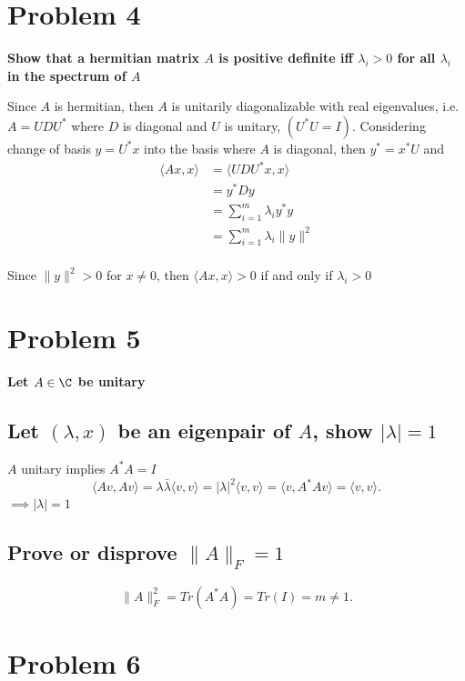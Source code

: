 \section{Problem 4}%
\label{sec:problem_4}

\textbf{Show that a hermitian matrix $A$ is positive definite iff $\lambda
_{i}>0$ for all $\lambda _{i}$ in the spectrum of $A$} 

Since $A$ is hermitian, then $A$ is unitarily diagonalizable with real
eigenvalues, i.e. $A = UDU^{*}$ where $D$ is diagonal and $U$ is unitary,
$ (U^{*}U = I)$. Considering change of basis $y = U^{*}x$ into the basis where
$A$ is diagonal, then $y^{*} = x^{*}U$ and
\begin{align*}
  \langle Ax,x \rangle &= \langle UDU^{*}x,x \rangle \\
                       &= y^{*}Dy \\
                       &= \sum^{m}_{i=1} \lambda _{i}y^{*}y \\
                       &= \sum^{m}_{i=1} \lambda _{i}\|y\|^{2} \\
\end{align*}

Since $\|y\|^{2} > 0$ for $x \neq 0$, then $ \langle Ax,x \rangle > 0 $ if and
only if $\lambda _{i} > 0$

\section{Problem 5}%
\label{sec:problem_5}

\textbf{Let $A\in\C$ be unitary} 

\subsection{Let $ (\lambda, x)$ be an eigenpair of $A$, show $|\lambda | = 1$}%
\label{sub:5.1}
$A$ unitary implies $A^{*}A = I$
\[
\langle Av,Av\rangle = \lambda\bar\lambda\langle v,v\rangle
= |\lambda|^2 \langle v, v\rangle = \langle v,A^*Av\rangle = \langle
v ,v\rangle
.\] 
$\implies |\lambda| = 1$ 

\subsection{Prove or disprove $\|A\|_{F} = 1$}%
\label{sub:5.2}

\[
\|A\|_F^2=Tr(A^*A)=Tr(I)=m\neq1
.\] 


\section{Problem 6}%
\label{sec:problem_6}

